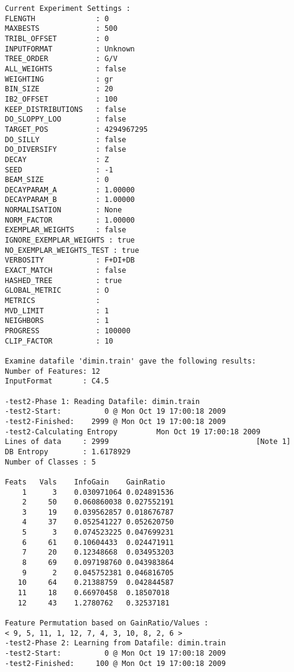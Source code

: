 \documentclass{report}
\begin{document}
\begin{footnotesize}
\begin{verbatim}
Current Experiment Settings :
FLENGTH              : 0
MAXBESTS             : 500
TRIBL_OFFSET         : 0
INPUTFORMAT          : Unknown
TREE_ORDER           : G/V
ALL_WEIGHTS          : false
WEIGHTING            : gr
BIN_SIZE             : 20
IB2_OFFSET           : 100
KEEP_DISTRIBUTIONS   : false
DO_SLOPPY_LOO        : false
TARGET_POS           : 4294967295
DO_SILLY             : false
DO_DIVERSIFY         : false
DECAY                : Z
SEED                 : -1
BEAM_SIZE            : 0
DECAYPARAM_A         : 1.00000
DECAYPARAM_B         : 1.00000
NORMALISATION        : None
NORM_FACTOR          : 1.00000
EXEMPLAR_WEIGHTS     : false
IGNORE_EXEMPLAR_WEIGHTS : true
NO_EXEMPLAR_WEIGHTS_TEST : true
VERBOSITY            : F+DI+DB
EXACT_MATCH          : false
HASHED_TREE          : true
GLOBAL_METRIC        : O
METRICS              :
MVD_LIMIT            : 1
NEIGHBORS            : 1
PROGRESS             : 100000
CLIP_FACTOR          : 10

Examine datafile 'dimin.train' gave the following results:
Number of Features: 12
InputFormat       : C4.5

-test2-Phase 1: Reading Datafile: dimin.train
-test2-Start:          0 @ Mon Oct 19 17:00:18 2009
-test2-Finished:    2999 @ Mon Oct 19 17:00:18 2009
-test2-Calculating Entropy         Mon Oct 19 17:00:18 2009
Lines of data     : 2999                                  [Note 1]
DB Entropy        : 1.6178929
Number of Classes : 5

Feats	Vals	InfoGain	GainRatio
    1      3	0.030971064	0.024891536
    2     50	0.060860038	0.027552191
    3     19	0.039562857	0.018676787
    4     37	0.052541227	0.052620750
    5      3	0.074523225	0.047699231
    6     61	0.10604433	0.024471911
    7     20	0.12348668	0.034953203
    8     69	0.097198760	0.043983864
    9      2	0.045752381	0.046816705
   10     64	0.21388759	0.042844587
   11     18	0.66970458	0.18507018
   12     43	1.2780762	0.32537181

Feature Permutation based on GainRatio/Values :
< 9, 5, 11, 1, 12, 7, 4, 3, 10, 8, 2, 6 >
-test2-Phase 2: Learning from Datafile: dimin.train
-test2-Start:          0 @ Mon Oct 19 17:00:18 2009
-test2-Finished:     100 @ Mon Oct 19 17:00:18 2009


\end{verbatim}
\end{footnotesize}
\end{document}
